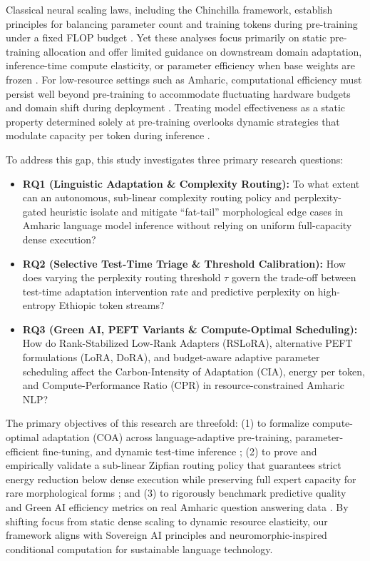 \documentclass{interact}
\begin{document}
Classical neural scaling laws, including the Chinchilla framework, establish principles for balancing parameter count and training tokens during pre-training under a fixed FLOP budget \cite{ref9}. Yet these analyses focus primarily on static pre-training allocation and offer limited guidance on downstream domain adaptation, inference-time compute elasticity, or parameter efficiency when base weights are frozen \cite{ref10,ref11}. For low-resource settings such as Amharic, computational efficiency must persist well beyond pre-training to accommodate fluctuating hardware budgets and domain shift during deployment \cite{ref12}. Treating model effectiveness as a static property determined solely at pre-training overlooks dynamic strategies that modulate capacity per token during inference \cite{ref13,ref14,ref15}.

To address this gap, this study investigates three primary research questions:
\begin{itemize}
    \item \textbf{RQ1 (Linguistic Adaptation \& Complexity Routing):} To what extent can an autonomous, sub-linear complexity routing policy and perplexity-gated heuristic isolate and mitigate ``fat-tail'' morphological edge cases in Amharic language model inference without relying on uniform full-capacity dense execution?
    \item \textbf{RQ2 (Selective Test-Time Triage \& Threshold Calibration):} How does varying the perplexity routing threshold $\tau$ govern the trade-off between test-time adaptation intervention rate and predictive perplexity on high-entropy Ethiopic token streams?
    \item \textbf{RQ3 (Green AI, PEFT Variants \& Compute-Optimal Scheduling):} How do Rank-Stabilized Low-Rank Adapters (RSLoRA), alternative PEFT formulations (LoRA, DoRA), and budget-aware adaptive parameter scheduling affect the Carbon-Intensity of Adaptation (CIA), energy per token, and Compute-Performance Ratio (CPR) in resource-constrained Amharic NLP?
\end{itemize}

The primary objectives of this research are threefold: (1) to formalize compute-optimal adaptation (COA) across language-adaptive pre-training, parameter-efficient fine-tuning, and dynamic test-time inference \cite{ref13}; (2) to prove and empirically validate a sub-linear Zipfian routing policy that guarantees strict energy reduction below dense execution while preserving full expert capacity for rare morphological forms \cite{ref14,ref18,ref20}; and (3) to rigorously benchmark predictive quality and Green AI efficiency metrics on real Amharic question answering data \cite{ref15}. By shifting focus from static dense scaling to dynamic resource elasticity, our framework aligns with Sovereign AI principles \cite{ref70} and neuromorphic-inspired conditional computation \cite{ref69} for sustainable language technology.
\end{document}
